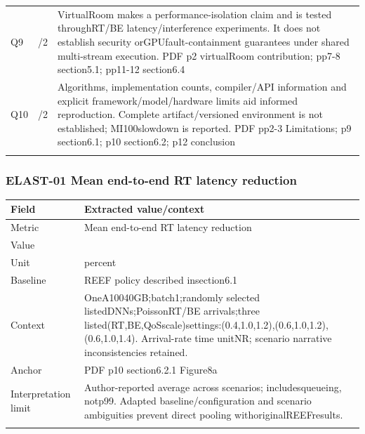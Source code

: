 \begin{longtable}{>{\raggedright\arraybackslash}p{}>{\raggedright\arraybackslash}p{}>{\raggedright\arraybackslash}p{}}
Q9 & 1/2 & VirtualRoom makes a performance-isolation claim and is tested throughRT/BE latency/interference experiments. It does not establish security orGPUfault-containment guarantees under shared multi-stream execution. PDF p2 virtualRoom contribution;\allowbreak{} pp7-8 section5.1;\allowbreak{} pp11-12 section6.4\\\addlinespace
Q10 & 1/2 & Algorithms,\allowbreak{} implementation counts,\allowbreak{} compiler/API information and explicit framework/model/hardware limits aid informed reproduction. Complete artifact/versioned environment is not established;\allowbreak{} MI100slowdown is reported. PDF pp2-3 Limitations;\allowbreak{} p9 section6.1;\allowbreak{} p10 section6.2;\allowbreak{} p12 conclusion\\\addlinespace
\bottomrule\end{longtable}
\subsubsection*{ELAST-01 Mean end-to-end RT latency reduction}
\begin{longtable}{>{\raggedright\arraybackslash}p{}>{\raggedright\arraybackslash}p{}}
\toprule
\textbf{Field} & \textbf{Extracted value/context}\\\midrule\endhead
Metric & Mean end-to-end RT latency reduction\\\addlinespace
Value & 22\\\addlinespace
Unit & percent\\\addlinespace
Baseline & REEF policy described insection6.1\\\addlinespace
Context & OneA10040GB;\allowbreak{}batch1;\allowbreak{}randomly selected listedDNNs;\allowbreak{}PoissonRT/BE arrivals;\allowbreak{}three listed(RT,\allowbreak{}BE,\allowbreak{}QoSscale)settings:(0.4,\allowbreak{}1.0,\allowbreak{}1.2),\allowbreak{}(0.6,\allowbreak{}1.0,\allowbreak{}1.2),\allowbreak{}(0.6,\allowbreak{}1.0,\allowbreak{}1.4). Arrival-rate time unitNR;\allowbreak{} scenario narrative inconsistencies retained.\\\addlinespace
Anchor & PDF p10 section6.2.1 Figure8a\\\addlinespace
Interpretation limit & Author-reported average across scenarios;\allowbreak{} includesqueueing,\allowbreak{} notp99. Adapted baseline/configuration and scenario ambiguities prevent direct pooling withoriginalREEFresults.\\\addlinespace
\bottomrule\end{longtable}
